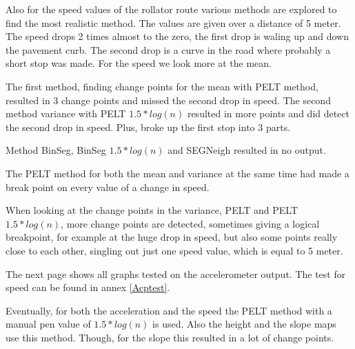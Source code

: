 Also for the speed values of the rollator route various methods are explored to find the most realistic method. The values are given over a distance of 5 meter. 
The speed drops 2 times almost to the zero, the first drop is waling up and down the pavement curb. The second drop is a curve in the road where probably a short stop was made. For the speed we look more at the mean.

The first method, finding change points for the mean with PELT method, resulted in 3 change points and missed the second drop in speed.  The second method variance with PELT $1.5*log(n)$ resulted in more points and did detect the second drop in speed. Plus, broke up the first stop into 3 parts. 

Method BinSeg, BinSeg $1.5*log(n)$ and SEGNeigh resulted in no output.

The PELT method for both the mean and variance at the same time had made a break point on every value of a change in speed. 

When looking at the change points in the variance, PELT and PELT $1.5*log(n)$, more change points are detected, sometimes giving a logical breakpoint, for example at the huge drop in speed, but also some points really close to each other, singling out just one speed value, which is equal to 5 meter. 


The next page shows all graphs tested on the accelerometer output. The test for speed can be found in annex \ref{Acptest}.

Eventually, for both the acceleration and the speed the PELT method with a manual pen value of $1.5 * log(n)$ is used.
Also the height and the slope maps use this method. Though, for the slope this resulted in a lot of change points. 

\clearpage

